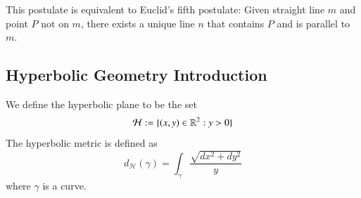 \documentclass[12pt, a4paper, oneside, openright, titlepage]{book}
\begin{document}
\begin{namthm}
    This postulate is equivalent to Euclid's fifth postulate: Given straight line $m$ and point $P$ not on $m$, there exists a unique line $n$ that contains $P$ and is parallel to $m$.
\end{namthm}

\subsection{Hyperbolic Geometry Introduction}

\begin{defn}
    We define the hyperbolic plane to be the set \begin{equation}
        \mathcal{H} := \{(x,y) \in \mathbb R^2:y>0\}
    \end{equation}
    The hyperbolic metric is defined as \begin{equation}
        d_{\mathcal{H}}(\gamma) = \int_{\gamma}\frac{\sqrt{dx^2+dy^2}}{y}
    \end{equation}
    where $\gamma$ is a curve.
\end{defn}
\end{document}
